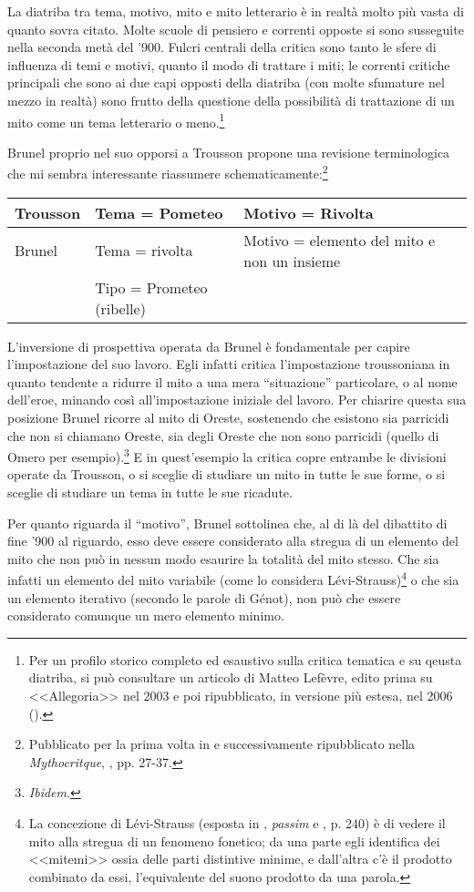 \documentclass[12pt,a4paper,openright, oneside]{book}
\begin{document}
La diatriba tra tema, motivo, mito e mito letterario è in realtà molto più vasta di quanto sovra citato. Molte scuole di pensiero e correnti opposte si sono susseguite nella seconda metà del '900. Fulcri centrali della critica sono tanto le sfere di influenza di temi e motivi, quanto il modo di trattare i miti; le correnti critiche principali che sono ai due capi opposti della diatriba (con molte sfumature nel mezzo in realtà) sono frutto della questione della possibilità di trattazione di un mito come un tema letterario o meno.\footnote{Per un profilo storico completo ed esaustivo sulla critica tematica e su qeusta diatriba, si può consultare un articolo di Matteo Lefèvre, edito prima su <<Allegoria>> nel 	2003 e poi ripubblicato, in versione più estesa, nel 2006 (\cite{Lefevre}).} 

Brunel proprio nel suo opporsi a Trousson propone una revisione terminologica che mi sembra interessante riassumere schematicamente:\footnote{Pubblicato per la prima volta in \cite{Brunel3} e successivamente ripubblicato nella \textit{Mythocritque}, \cite{Brunel1}, pp. 27-37.}
\vspace{1cm}
\begin{center}
\begin{tabular}{| p{4cm} | p{4cm} | p{4cm} |}\hline
Trousson&Tema = Pometeo&Motivo = Rivolta\\\hline
Brunel&Tema = rivolta&Motivo = elemento del mito e non un insieme\\
&Tipo = Prometeo (ribelle)&\\\hline
\end{tabular}
\end{center}
\vspace{1cm}

L'inversione di prospettiva operata da Brunel è fondamentale per capire l'impostazione del suo lavoro. Egli infatti critica l'impostazione troussoniana in quanto tendente a ridurre il mito a una mera ``situazione'' particolare, o al nome dell'eroe, minando così all'impostazione iniziale del lavoro. Per chiarire questa sua posizione Brunel ricorre al mito di Oreste, sostenendo che esistono sia parricidi che non si chiamano Oreste, sia degli Oreste che non sono parricidi (quello di Omero per esempio).\footnote{\textit{Ibidem}.} E in quest'esempio la critica copre entrambe le divisioni operate da Trousson, o si sceglie di studiare un mito in tutte le sue forme, o si sceglie di studiare un tema in tutte le sue ricadute.

Per quanto riguarda il ``motivo'', Brunel sottolinea che, al di là del dibattito di fine '900 al riguardo, esso deve essere considerato alla stregua di un elemento del mito che non può in nessun modo esaurire la totalità del mito stesso. Che sia infatti un elemento del mito variabile (come lo considera Lévi-Strauss)\footnote{La concezione di Lévi-Strauss (esposta in \cite{Levi1}, \textit{passim} e \cite{Levi2}, p. 240) è di vedere il mito alla stregua di un fenomeno fonetico; da una parte egli identifica dei <<mitemi>> ossia delle parti distintive minime, e dall'altra c'è il prodotto combinato da essi, l'equivalente del suono prodotto da una parola.} o che sia un elemento iterativo (secondo le parole di Génot), non può che essere considerato comunque un mero elemento minimo.
\end{document}
